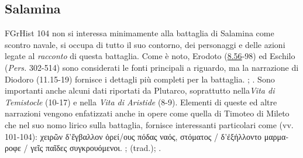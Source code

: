 \small{\subsection*{Salamina}
FGrHist 104 non si interessa minimamente alla
battaglia di Salamina come scontro navale, si occupa di tutto il suo
contorno, dei personaggi e delle azioni legate al \textit{racconto} di
questa battaglia. Come è noto, Erodoto (\href{http://data.perseus.org/citations/urn:cts:greekLit:tlg0016.tlg001.perseus-grc1:8.56}{8.56}-98) ed
Eschilo (\textit{Pers.}
302-514) sono considerati le fonti principali a
riguardo, ma la narrazione  di Diodoro (11.15-19) fornisce i dettagli più
completi per la battaglia. \cite[67-73]{Roux1974}; \cite[13s]{Parker2007}.
Sono importanti anche alcuni dati riportati da Plutarco, soprattutto nella\textit{Vita di Temistocle} (10-17) e nella \textit{Vita di Aristide} (8-9). 
Elementi di queste ed altre narrazioni vengono enfatizzati anche in opere come quella di
Timoteo di Mileto che nel suo nomo lirico
sulla battaglia,  fornisce interessanti particolari come (vv.
101-104): \textgreek{χειρῶν δ'ἔγβαλλον ὀρεί/ους πόδας ναός, στόματος / δ'ἐξήλλοντο μαρμαροφε / γεῖς παῖδες συγκρουόμενοι.} \cite[60]{Janssen1984}; \cite[155]{ Kuch1995} (trad.); \cite[48s]{Gambetti2001}.
}
